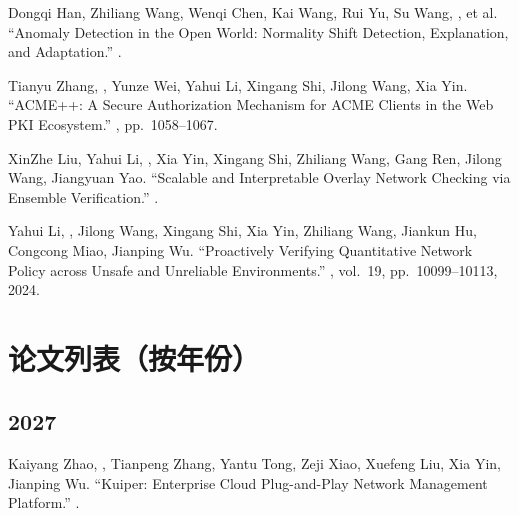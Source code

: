 \documentclass[11pt]{article}
\begin{document}
\begin{publist}[resume]
\item Dongqi Han, Zhiliang Wang\corr, Wenqi Chen, Kai Wang, Rui Yu, Su Wang, , et al. ``Anomaly Detection in the Open World: Normality Shift Detection,
Explanation, and Adaptation.'' .

\item Tianyu Zhang, \corr, Yunze Wei, Yahui Li, Xingang Shi, Jilong
Wang, Xia Yin. ``ACME++: A Secure Authorization Mechanism for ACME Clients in the Web PKI
Ecosystem.'' , pp.~1058--1067.

\item XinZhe Liu, Yahui Li\corr, , Xia Yin, Xingang Shi, Zhiliang Wang,
Gang Ren, Jilong Wang, Jiangyuan Yao. ``Scalable and Interpretable Overlay Network
Checking via Ensemble Verification.'' .

\item Yahui Li, \corr, Jilong Wang, Xingang Shi, Xia Yin, Zhiliang Wang,
Jiankun Hu, Congcong Miao, Jianping Wu. ``Proactively Verifying Quantitative Network
Policy across Unsafe and Unreliable Environments.'' , vol.~19, pp.~10099--10113, 2024.

\end{publist}

\section{论文列表（按年份）}

\subsection*{2027}
\begin{publist}
\item Kaiyang Zhao, \corr, Tianpeng Zhang, Yantu Tong, Zeji Xiao,
Xuefeng Liu, Xia Yin, Jianping Wu. ``Kuiper: Enterprise Cloud Plug-and-Play Network
Management Platform.'' . 
\end{publist}
\end{document}
